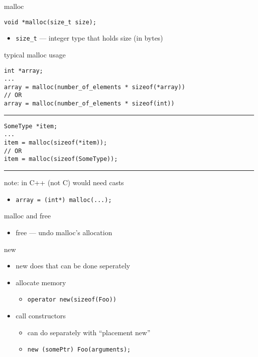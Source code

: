 \begin{frame}[fragile,label=mallocPrototype]{malloc}
\lstset{language=C++,style=small}
\begin{lstlisting}
void *malloc(size_t size);
\end{lstlisting}
\begin{itemize}
\item \texttt{size\_t} --- integer type that holds size (in bytes)
\end{itemize}
\end{frame}

\begin{frame}[fragile,label=mallocUsage1]{typical malloc usage}
\lstset{language=C++,style=smaller}
\begin{lstlisting}
int *array;
...
array = malloc(number_of_elements * sizeof(*array))
// OR
array = malloc(number_of_elements * sizeof(int))
\end{lstlisting}
\hrule
\begin{lstlisting}
SomeType *item;
...
item = malloc(sizeof(*item));
// OR
item = malloc(sizeof(SomeType));
\end{lstlisting}
\hrule
note: in C++ (not C) would need casts
    \begin{itemize}
        \item \lstinline|array = (int*) malloc(...);|
    \end{itemize}
\end{frame}

\begin{frame}{malloc and free}
\begin{itemize}
\item free --- undo malloc's allocation
\end{itemize}
\end{frame}

\begin{frame}[fragile,label=newParts]{new}
\lstset{language=C++}
\begin{itemize}
    \item new does  that can be done seperately
    \vspace{.5cm}
    \item allocate memory
        \begin{itemize}
        \item \texttt{operator new(sizeof(Foo))}
        \end{itemize}
    \item call constructors
        \begin{itemize}
        \item can do separately with ``placement new''
        \item \lstinline|new (somePtr) Foo(arguments);|
        \end{itemize}
    \end{itemize}
\end{frame}

